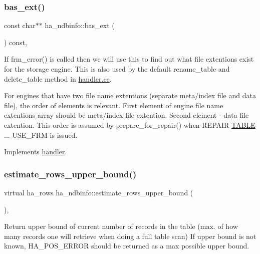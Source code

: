 \subsubsection{\texorpdfstring{bas\+\_\+ext()}{bas\_ext()}}
{\footnotesize\ttfamily const char$\ast$$\ast$ ha\+\_\+ndbinfo\+::bas\+\_\+ext (\begin{DoxyParamCaption}{ }\end{DoxyParamCaption}) const\hspace{0.3cm}{\ttfamily [inline]}, {\ttfamily [virtual]}}

If frm\+\_\+error() is called then we will use this to find out what file extentions exist for the storage engine. This is also used by the default rename\+\_\+table and delete\+\_\+table method in \mbox{\hyperlink{handler_8cc}{handler.\+cc}}.

For engines that have two file name extentions (separate meta/index file and data file), the order of elements is relevant. First element of engine file name extentions array should be meta/index file extention. Second element -\/ data file extention. This order is assumed by prepare\+\_\+for\+\_\+repair() when R\+E\+P\+A\+IR \mbox{\hyperlink{structTABLE}{T\+A\+B\+LE}} ... U\+S\+E\+\_\+\+F\+RM is issued. 

Implements \mbox{\hyperlink{classhandler_a748d5e5b6dbbb0681cbac2ad881505c9}{handler}}.

\mbox{\label{classha__ndbinfo_a343b6837bb14a74236095276dec644dd}} 
\subsubsection{\texorpdfstring{estimate\+\_\+rows\+\_\+upper\+\_\+bound()}{estimate\_rows\_upper\_bound()}}
{\footnotesize\ttfamily virtual ha\+\_\+rows ha\+\_\+ndbinfo\+::estimate\+\_\+rows\+\_\+upper\+\_\+bound (\begin{DoxyParamCaption}{ }\end{DoxyParamCaption})\hspace{0.3cm}{\ttfamily [inline]}, {\ttfamily [virtual]}}

Return upper bound of current number of records in the table (max. of how many records one will retrieve when doing a full table scan) If upper bound is not known, H\+A\+\_\+\+P\+O\+S\+\_\+\+E\+R\+R\+OR should be returned as a max possible upper bound. 

